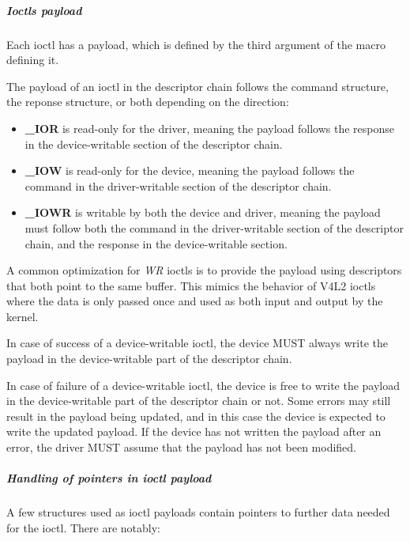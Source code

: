 \subparagraph{Ioctls payload}\label{sec:Device Types / Media Device / V4L2 ioctls / Ioctls payload}

Each ioctl has a payload, which is defined by the third argument of the
 macro defining it. 

The payload of an ioctl in the descriptor chain follows the command structure,
the reponse structure, or both depending on the direction:

\begin{itemize}
\item \textbf{_IOR} is read-only for the driver, meaning the payload
follows the response in the device-writable section of the descriptor chain.
\item \textbf{_IOW} is read-only for the device, meaning the payload
follows the command in the driver-writable section of the descriptor chain.
\item \textbf{_IOWR} is writable by both the device and driver,
meaning the payload must follow both the command in the driver-writable section
of the descriptor chain, and the response in the device-writable section.
\end{itemize}

A common optimization for \textit{WR} ioctls is to provide the payload using
descriptors that both point to the same buffer. This mimics the behavior of
V4L2 ioctls where the data is only passed once and used as both input and
output by the kernel.


In case of success of a device-writable ioctl, the device MUST always write the
payload in the device-writable part of the descriptor chain.


In case of failure of a device-writable ioctl, the device is free to write the
payload in the device-writable part of the descriptor chain or not. Some errors
may still result in the payload being updated, and in this case the device is
expected to write the updated payload. If the device has not written the
payload after an error, the driver MUST assume that the payload has not been
modified.

\subparagraph{Handling of pointers in ioctl payload}

A few structures used as ioctl payloads contain pointers to further
data needed for the ioctl. There are notably:

